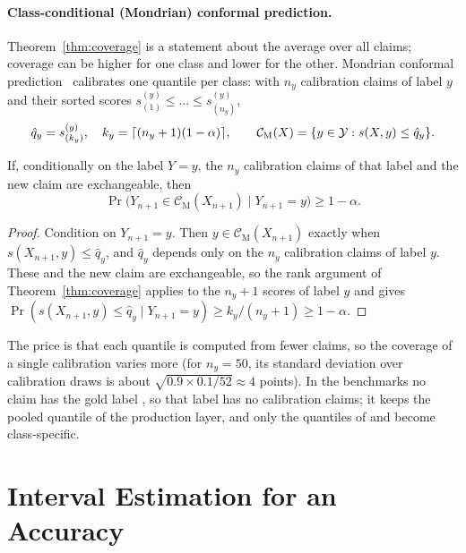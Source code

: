 \paragraph{Class-conditional (Mondrian) conformal prediction.} Theorem~\ref{thm:coverage} is a statement about the average over all claims; coverage can be higher for one class and lower for the other. Mondrian conformal prediction~\citep{vovk2005algorithmic} calibrates one quantile per class: with $n_y$ calibration claims of label $y$ and their sorted scores $s^{(y)}_{(1)} \le \dots \le s^{(y)}_{(n_y)}$,
\begin{equation}
  \hat{q}_y = s^{(y)}_{(k_y)}, \quad k_y = \lceil (n_y + 1)(1 - \alpha) \rceil, \qquad
  \mathcal{C}_{\text{M}}(X) = \{ y \in \mathcal{Y} : s(X, y) \le \hat{q}_y \}.
\end{equation}

\begin{theorem}
\label{thm:mondrian}
If, conditionally on the label $Y = y$, the $n_y$ calibration claims of that label and the new claim are exchangeable, then
\begin{equation}
  \Pr\bigl( Y_{n+1} \in \mathcal{C}_{\text{M}}(X_{n+1}) \mid Y_{n+1} = y \bigr) \ge 1 - \alpha .
\end{equation}
\end{theorem}

\begin{proof}
Condition on $Y_{n+1} = y$. Then $y \in \mathcal{C}_{\text{M}}(X_{n+1})$ exactly when $s(X_{n+1}, y) \le \hat{q}_y$, and $\hat{q}_y$ depends only on the $n_y$ calibration claims of label $y$. These and the new claim are exchangeable, so the rank argument of Theorem~\ref{thm:coverage} applies to the $n_y + 1$ scores of label $y$ and gives $\Pr(s(X_{n+1}, y) \le \hat{q}_y \mid Y_{n+1} = y) \ge k_y / (n_y + 1) \ge 1 - \alpha$.
\end{proof}

The price is that each quantile is computed from fewer claims, so the coverage of a single calibration varies more (for $n_y = 50$, its standard deviation over calibration draws is about $\sqrt{0.9 \times 0.1 / 52} \approx 4$ points). In the benchmarks no claim has the gold label \Unk, so that label has no calibration claims; it keeps the pooled quantile of the production layer, and only the quantiles of \Con{} and \Sup{} become class-specific.


\section{Interval Estimation for an Accuracy}
\label{sec:wilson}

